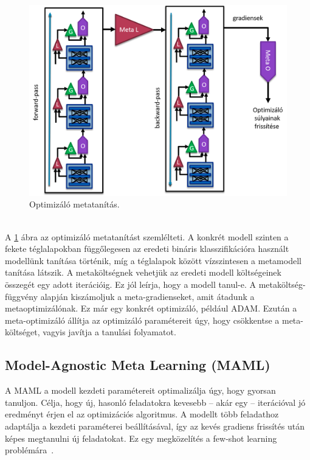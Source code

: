 \begin{figure}[!ht]
	\centering
	\includegraphics[width=140mm, keepaspectratio]{figures/meta-opt.png}
	\caption{Optimizáló metatanítás.}
	\label{fig:meta-opt}
\end{figure}
\ \\
A \ref{fig:meta-opt} ábra az optimizáló metatanítást szemlélteti. A konkrét modell szinten  a fekete téglalapokban függőlegesen az eredeti bináris klasszifikációra használt modellünk tanítása történik, míg a téglalapok között vízszintesen a metamodell tanítása látszik.
\newline
\newline
A metaköltségnek vehetjük az eredeti modell költségeinek összegét egy adott iterációig. Ez jól leírja, hogy a modell tanul-e. A metaköltség-függvény alapján kiszámoljuk a meta-gradienseket, amit átadunk a metaoptimizálónak. Ez már egy konkrét optimizáló, például ADAM. Ezután a meta-optimizáló állítja az optimizáló paramétereit úgy, hogy csökkentse a meta-költséget, vagyis javítja a tanulási folyamatot. 

\subsection{Model-Agnostic Meta Learning (MAML)}


A MAML a modell kezdeti paramétereit optimalizálja úgy, hogy gyorsan tanuljon. Célja, hogy új, hasonló feladatokra kevesebb -- akár egy -- iterációval jó eredményt érjen el az optimizációs algoritmus. A modellt több feladathoz adaptálja a kezdeti paraméterei beállításával, így az kevés gradiens frissítés után képes megtanulni új feladatokat. Ez egy megközelítés a few-shot learning problémára~\cite{maml}.

